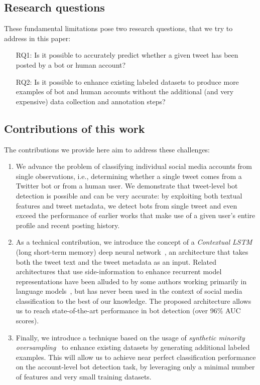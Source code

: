 \subsection{Research questions}
These fundamental limitations pose two research questions, that we try to address in this paper:

\begin{itemize}
\item[RQ1:] Is it possible to accurately predict whether a given tweet has been posted by a bot or human account?
\item[RQ2:] Is it possible to enhance existing labeled datasets to produce more examples of bot and human accounts without the additional (and very expensive) data collection and annotation steps?
\end{itemize}

\subsection{Contributions of this work}
The contributions we provide here aim to address these challenges:

\begin{enumerate}
\item We advance the problem of classifying individual social media accounts from single observations, i.e., determining whether a single tweet comes from a Twitter bot or from a human user. We demonstrate that tweet-level bot detection is possible and can be very accurate: by exploiting both textual features and tweet metadata, we detect bots from single tweet and even exceed the performance of earlier works that make use of a given user's entire profile and recent posting history.

\item As a technical contribution, we introduce the concept of a \textit{Contextual LSTM} (long short-term memory) deep neural network~\cite{hochreiter1997long,gers1999learning}, an architecture that takes both the tweet text and the tweet metadata as an input. Related architectures that use side-information to enhance recurrent model representations have been alluded to by some authors working primarily in language models~\cite{hoang2016incorporating,auli2013joint,mikolov2012context}, but has never been used in the context of social media classification to the best of our knowledge. The proposed architecture allows us to reach state-of-the-art performance in bot detection (over 96\% AUC scores).

\item Finally, we introduce a technique based on the usage of \textit{synthetic minority oversampling}~\cite{chawla2002smote} to enhance existing datasets by generating additional labeled examples. This will allow us to achieve near perfect classification performance on the account-level bot detection task, by leveraging only a minimal number of features and very small training datasets. 
\end{enumerate}


